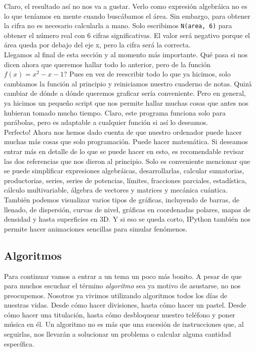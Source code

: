\documentclass[10pt,letterpaper]{article}
\newcommand{\inlinecode}[1]{
\colorbox{light-gray}{\texttt{#1}}
}
\begin{document}
\noindent Claro, el resultado as\'i no nos va a gustar. Verlo como expresi\'on algebr\'aica no es lo que ten\'iamos en mente cuando busc\'abamos el \'area. Sin embargo, para obtener la cifra no es necesario calcularla a mano. Solo escribimos \inlinecode{N(area, 6)} para obtener el n\'umero real con 6 cifras significativas. El valor ser\'a negativo porque el \'area queda por debajo del eje x, pero la cifra ser\'a la correcta.\\

Llegamos al final de esta secci\'on y al momento m\'as importante. Qu\'e pasa si nos dicen ahora que queremos hallar todo lo anterior, pero de la funci\'on $f(x) = x^2 - x - 1$? Pues en vez de reescribir todo lo que ya hicimos, solo cambiamos la funci\'on al principio y reiniciamos nuestro cuaderno de notas. Quiz\'a cambiar de d\'onde a d\'onde queremos graficar ser\'ia conveniente. Pero en general, ya hicimos un peque\~no script que nos permite hallar muchas cosas que antes nos hubieran tomado mucho tiempo. Claro, este programa funciona solo para par\'abolas, pero es adaptable a cualquier funci\'on si as\'i lo deseamos.\\

Perfecto! Ahora nos hemos dado cuenta de que nuestro ordenador puede hacer muchas m\'as cosas que solo programaci\'on. Puede hacer matem\'atica. Si deseamos entrar m\'as en detalle de lo que se puede hacer en esto, es recomendable revisar las dos referencias que nos dieron al principio. Solo es conveniente mencionar que se puede simplificar expresiones algebr\'aicas, desarrollarlas, calcular sumatorias, productorias, series, series de potencias, l\'imites, fracciones parciales, estad\'istica, c\'alculo multivariable, \'algebra de vectores y matrices y mec\'anica cu\'antica. Tambi\'en podemos visualizar varios tipos de gr\'aficas, incluyendo de barras, de llenado, de dispersi\'on, curvas de nivel, gr\'aficas en coordenadas polares, mapas de densidad y hasta superficies en 3D. Y si eso se queda corto, IPython tambi\'en nos permite hacer animaciones sencillas para simular fen\'omenos.

\subsection{Algoritmos}
Para continuar vamos a entrar a un tema un poco m\'as bonito. A pesar de que para muchos escuchar el t\'ermino \emph{algoritmo} sea ya motivo de asustarse, no nos preocupemos. Nosotros ya vivimos utilizando algoritmos todos los d\'ias de nuestras vidas. Desde c\'omo hacer divisiones, hasta c\'omo hacer un pastel. Desde c\'omo hacer una titulaci\'on, hasta c\'omo desbloquear nuestro tel\'efono y poner m\'usica en \'el. Un algoritmo no es m\'as que una sucesi\'on de instrucciones que, al seguirlas, nos llevar\'an a solucionar un problema o calcular alguna cantidad espec\'ifica.\\
\end{document}
